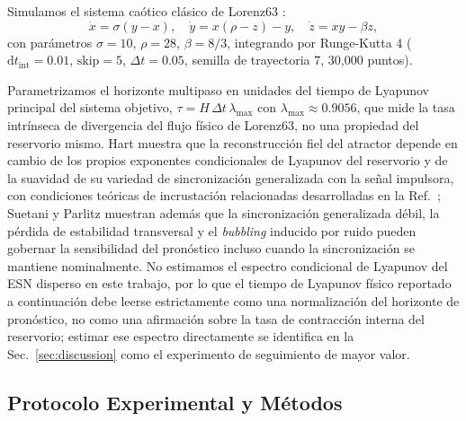 \documentclass[aip,cha,reprint,amsmath,amssymb]{revtex4-2}
\begin{document}
Simulamos el sistema caótico clásico de Lorenz63 \cite{lorenz1963deterministic}:
\begin{equation}
\dot{x} = \sigma (y - x), \quad \dot{y} = x (\rho - z) - y, \quad \dot{z} = x y - \beta z,
\end{equation}
con parámetros $\sigma = 10$, $\rho = 28$, $\beta = 8/3$, integrando por Runge-Kutta 4 ($\mathrm{d}t_{\text{int}} = 0.01$, $\text{skip} = 5$, $\Delta t = 0.05$, semilla de trayectoria 7, 30,000 puntos).

Parametrizamos el horizonte multipaso en unidades del tiempo de Lyapunov principal del sistema objetivo, $\tau = H\, \Delta t\, \lambda_{\max}$ con $\lambda_{\max} \approx 0.9056$, que mide la tasa intrínseca de divergencia del flujo físico de Lorenz63, no una propiedad del reservorio mismo. Hart \cite{hart2024attractor} muestra que la reconstrucción fiel del atractor depende en cambio de los propios exponentes condicionales de Lyapunov del reservorio y de la suavidad de su variedad de sincronización generalizada con la señal impulsora, con condiciones teóricas de incrustación relacionadas desarrolladas en la Ref.~; Suetani y Parlitz \cite{suetani2026impact} muestran además que la sincronización generalizada débil, la pérdida de estabilidad transversal y el \emph{bubbling} inducido por ruido pueden gobernar la sensibilidad del pronóstico incluso cuando la sincronización se mantiene nominalmente. No estimamos el espectro condicional de Lyapunov del ESN disperso en este trabajo, por lo que el tiempo de Lyapunov físico reportado a continuación debe leerse estrictamente como una normalización del horizonte de pronóstico, no como una afirmación sobre la tasa de contracción interna del reservorio; estimar ese espectro directamente se identifica en la Sec.~\ref{sec:discussion} como el experimento de seguimiento de mayor valor.

\subsection{Protocolo Experimental y Métodos}
\end{document}
